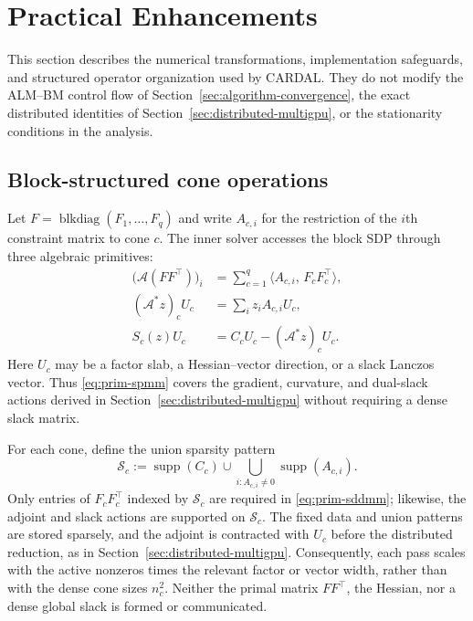 \documentclass[11pt]{article}
\theoremstyle{definition}
\theoremstyle{remark}
\newcommand{\name}{\textsc{CARDAL}\xspace}
\newcommand{\inner}[2]{\langle #1,\, #2\rangle}
\newcommand{\Aop}{\mathcal{A}}              %
\newcommand{\Aadj}{\mathcal{A}^{*}}         %
\newcommand{\Ffac}{F}                       %
\newcommand{\blkdiag}{\operatorname{blkdiag}}
\begin{document}

\section{Practical Enhancements}
\label{sec:enhancements}

This section describes the numerical transformations, implementation
safeguards, and structured operator organization used by \name{}.  They do
not modify the ALM--BM control flow of
Section~\ref{sec:algorithm-convergence}, the exact distributed identities of
Section~\ref{sec:distributed-multigpu}, or the stationarity conditions in the
analysis.

\subsection{Block-structured cone operations}
\label{subsec:coneops}

Let $\Ffac=\blkdiag(F_1,\ldots,F_q)$ and write $A_{c,i}$ for the
restriction of the $i$th constraint matrix to cone $c$.  The inner solver
accesses the block SDP through three algebraic primitives:
\begin{align}
  \bigl(\Aop(\Ffac\Ffac^\top)\bigr)_i
    &=\sum_{c=1}^{q}
      \inner{A_{c,i}}{F_cF_c^\top},
  \label{eq:prim-sddmm}\\
  (\Aadj z)_cU_c
    &=\sum_i z_iA_{c,i}U_c,
  \label{eq:prim-spmv}\\
  S_c(z)U_c
    &=C_cU_c-(\Aadj z)_cU_c.
  \label{eq:prim-spmm}
\end{align}
Here $U_c$ may be a factor slab, a Hessian--vector direction, or a slack
Lanczos vector.  Thus \eqref{eq:prim-spmm} covers the gradient, curvature,
and dual-slack actions derived in Section~\ref{sec:distributed-multigpu} without
requiring a dense slack matrix.

For each cone, define the union sparsity pattern
\begin{equation}
  \mathcal S_c
  :=\operatorname{supp}(C_c)
    \cup\bigcup_{i:A_{c,i}\neq0}\operatorname{supp}(A_{c,i}).
  \label{eq:cone-union-pattern}
\end{equation}
Only entries of $F_cF_c^\top$ indexed by $\mathcal S_c$ are required in
\eqref{eq:prim-sddmm}; likewise, the adjoint and slack actions are supported
on $\mathcal S_c$.  The fixed data and union patterns are stored sparsely,
and the adjoint is contracted with $U_c$ before the distributed reduction,
as in Section~\ref{sec:distributed-multigpu}.  Consequently, each pass scales with
the active nonzeros times the relevant factor or vector width, rather than
with the dense cone sizes $n_c^2$.  Neither the primal matrix
$\Ffac\Ffac^\top$, the Hessian, nor a dense global slack is formed or
communicated.
\end{document}

